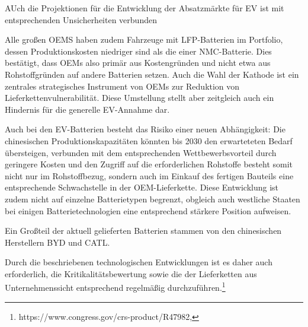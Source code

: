 \documentclass[12pt,a4paper,oneside]{book} %
\begin{document}
{{AUch die Projektionen für die Entwicklung der Absatzmärkte für EV ist mit entsprechenden Unsicherheiten verbunden

Alle großen OEMS haben zudem Fahrzeuge mit LFP-Batterien im Portfolio, dessen Produktionskosten niedriger sind als die einer NMC-Batterie.\autocite{https://www.mckinsey.com/industries/automotive-and-assembly/our-insights/the-battery-chemistries-powering-the-future-of-electric-vehicles} Dies bestätigt, dass OEMs also primär aus Kostengründen und nicht etwa aus Rohstoffgründen auf andere Batterien setzen. Auch die Wahl der Kathode ist ein zentrales strategisches Instrument von OEMs zur Reduktion von Lieferkettenvulnerabilität.\autocite[Most automotive manufacturers around the world are exercising increasing levels of control over their material supply chains as they design batteries for their vehicles"]{https://www.nature.com/articles/s41467-024-46418-1.pdf} Diese Umstellung stellt aber zeitgleich auch ein Hindernis für die generelle EV-Annahme dar.\autocite{ibid}

Auch bei den EV-Batterien besteht das Risiko einer neuen Abhängigkeit: Die chinesischen Produktionskapazitäten könnten bis 2030 den erwarteteten Bedarf übersteigen\autocite{Carnegie Endowment}, verbunden mit dem entsprechenden Wettbewerbsvorteil durch geringere Kosten und den Zugriff auf die erforderlichen Rohstoffe besteht somit nicht nur im Rohstoffbezug, sondern auch im Einkauf des fertigen Bauteils eine entsprechende Schwachstelle in der OEM-Lieferkette. Diese Entwicklung ist zudem nicht auf einzelne Batterietypen begrenzt, obgleich auch westliche Staaten bei einigen Batterietechnologien eine entsprechend stärkere Position aufweisen.

Ein Großteil der aktuell gelieferten Batterien stammen von den chinesischen Herstellern BYD und CATL.

Durch die beschriebenen technologischen Entwicklungen ist es daher auch erforderlich, die Kritikalitätsbewertung sowie die der Lieferketten aus Unternehmenssicht entsprechend regelmäßig durchzuführen.\footnote{https://www.congress.gov/crs-product/R47982, }

}}
\end{document}
